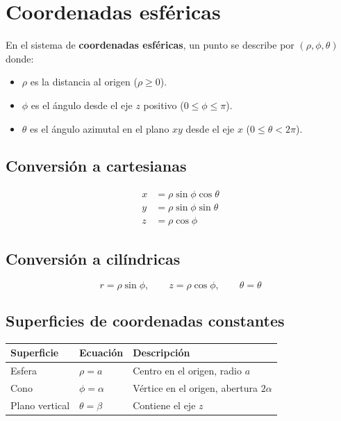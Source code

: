 \documentclass[
]{book}
\providecommand{\tightlist}{%
  \setlength{\itemsep}{0pt}\setlength{\parskip}{0pt}}
\begin{document}
\section{Coordenadas esféricas}\label{coordenadas-esfuxe9ricas}

En el sistema de \textbf{coordenadas esféricas}, un punto se describe por \((\rho, \phi, \theta)\) donde:

\begin{itemize}
\tightlist
\item
  \(\rho\) es la distancia al origen (\(\rho \geq 0\)).
\item
  \(\phi\) es el ángulo desde el eje \(z\) positivo (\(0 \leq \phi \leq \pi\)).
\item
  \(\theta\) es el ángulo azimutal en el plano \(xy\) desde el eje \(x\) (\(0 \leq \theta < 2\pi\)).
\end{itemize}

\subsection{Conversión a cartesianas}\label{conversiuxf3n-a-cartesianas-1}

\[
\begin{aligned}
x &= \rho \sin\phi \cos\theta \\
y &= \rho \sin\phi \sin\theta \\
z &= \rho \cos\phi
\end{aligned}
\]

\subsection{Conversión a cilíndricas}\label{conversiuxf3n-a-ciluxedndricas}

\[
r = \rho \sin\phi, \qquad z = \rho \cos\phi, \qquad \theta = \theta
\]

\subsection{Superficies de coordenadas constantes}\label{superficies-de-coordenadas-constantes-1}

\begin{longtable}[]{@{}lll@{}}
\toprule\noalign{}
Superficie & Ecuación & Descripción \\
\midrule\noalign{}
\endhead
\bottomrule\noalign{}
\endlastfoot
Esfera & \(\rho = a\) & Centro en el origen, radio \(a\) \\
Cono & \(\phi = \alpha\) & Vértice en el origen, abertura \(2\alpha\) \\
Plano vertical & \(\theta = \beta\) & Contiene el eje \(z\) \\
\end{longtable}
\end{document}
